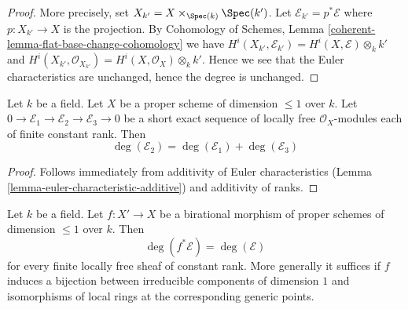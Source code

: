 \begin{proof}
More precisely, set $X_{k'} = X \times_{\Spec(k)} \Spec(k')$.
Let $\mathcal{E}_{k'} = p^*\mathcal{E}$ where $p : X_{k'} \to X$
is the projection. By
Cohomology of Schemes, Lemma \ref{coherent-lemma-flat-base-change-cohomology}
we have
$H^i(X_{k'}, \mathcal{E}_{k'}) = H^i(X, \mathcal{E}) \otimes_k k'$
and
$H^i(X_{k'}, \mathcal{O}_{X_{k'}}) = H^i(X, \mathcal{O}_X) \otimes_k k'$.
Hence we see that the Euler characteristics are unchanged, hence the
degree is unchanged.
\end{proof}

\begin{lemma}
\label{lemma-degree-additive}
Let $k$ be a field. Let $X$ be a proper scheme of dimension $\leq 1$
over $k$. Let $0 \to \mathcal{E}_1 \to \mathcal{E}_2 \to \mathcal{E}_3 \to 0$
be a short exact sequence of locally free $\mathcal{O}_X$-modules
each of finite constant rank. Then
$$
\deg(\mathcal{E}_2) = \deg(\mathcal{E}_1) + \deg(\mathcal{E}_3)
$$
\end{lemma}

\begin{proof}
Follows immediately from additivity of Euler characteristics
(Lemma \ref{lemma-euler-characteristic-additive})
and additivity of ranks.
\end{proof}

\begin{lemma}
\label{lemma-degree-birational-pullback}
Let $k$ be a field. Let $f : X' \to X$ be a birational morphism of
proper schemes of dimension $\leq 1$ over $k$. Then
$$
\deg(f^*\mathcal{E}) = \deg(\mathcal{E})
$$
for every finite locally free sheaf of constant rank. More generally
it suffices if $f$ induces a bijection between irreducible components
of dimension $1$ and isomorphisms of local rings at the corresponding
generic points.
\end{lemma}

